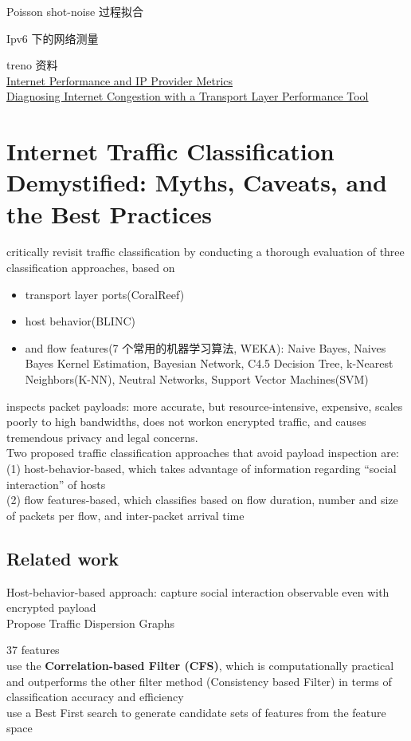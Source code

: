 \documentclass{article}
\begin{document}
Poisson shot-noise 过程拟合

Ipv6 下的网络测量

treno 资料\\\href{http://staff.psc.edu/mathis/ippm/}{Internet
Performance and IP Provider
Metrics}\\\href{http://staff.psc.edu/mathis/papers/inet96.treno.html}{Diagnosing
Internet Congestion with a Transport Layer Performance Tool}

\section{Internet Traffic Classification Demystified: Myths, Caveats, and the Best Practices}
critically revisit traffic classification by conducting a thorough evaluation of three classification approaches, based on
\begin{itemize}
\item transport layer ports(CoralReef)
\item host behavior(BLINC)
\item and flow features(7 个常用的机器学习算法, WEKA): Naive Bayes, Naives Bayes Kernel Estimation, Bayesian Network, C4.5 Decision Tree, k-Nearest Neighbors(K-NN), Neutral Networks, Support Vector Machines(SVM)
\end{itemize}

inspects packet payloads: more accurate, but resource-intensive, expensive, scales poorly to high bandwidths, does not workon encrypted traffic, and causes tremendous privacy and legal concerns. \\
Two proposed traffic classification approaches that avoid payload inspection are:\\
(1) host-behavior-based, which takes advantage of information regarding “social interaction” of hosts\\
(2) flow features-based, which classifies based on flow duration, number and size of packets per flow, and inter-packet arrival time

\subsection{Related work}
Host-behavior-based approach: capture social interaction observable even with encrypted payload\\
Propose Traffic Dispersion Graphs

37 features\\
use the \textbf{Correlation-based Filter (CFS)}, which is computationally practical 
and outperforms the other filter method (Consistency based Filter) in terms of classification accuracy and efficiency \\
use a Best First search to generate candidate sets of features from the feature space
\end{document}
